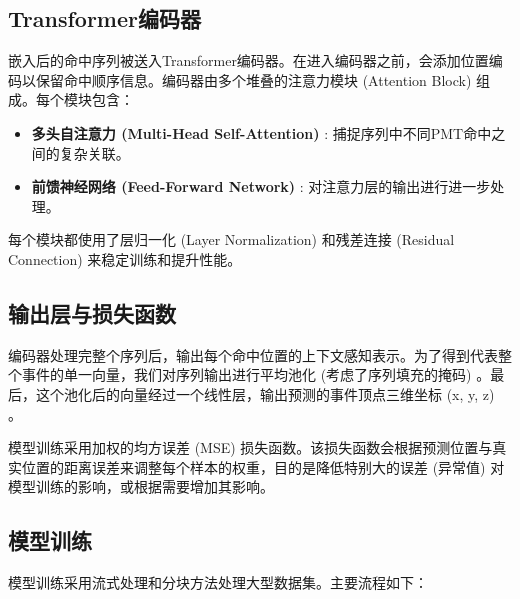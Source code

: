 \subsection{Transformer编码器}
嵌入后的命中序列被送入Transformer编码器。在进入编码器之前，会添加位置编码以保留命中顺序信息。编码器由多个堆叠的注意力模块 (Attention Block) 组成。每个模块包含：
\begin{itemize}
    \item \textbf{多头自注意力 (Multi-Head Self-Attention) }: 捕捉序列中不同PMT命中之间的复杂关联。
    \item \textbf{前馈神经网络 (Feed-Forward Network) }: 对注意力层的输出进行进一步处理。
\end{itemize}
每个模块都使用了层归一化 (Layer Normalization) 和残差连接 (Residual Connection) 来稳定训练和提升性能。

\subsection{输出层与损失函数}
编码器处理完整个序列后，输出每个命中位置的上下文感知表示。为了得到代表整个事件的单一向量，我们对序列输出进行平均池化 (考虑了序列填充的掩码) 。最后，这个池化后的向量经过一个线性层，输出预测的事件顶点三维坐标 (x, y, z) 。

模型训练采用加权的均方误差 (MSE) 损失函数。该损失函数会根据预测位置与真实位置的距离误差来调整每个样本的权重，目的是降低特别大的误差 (异常值) 对模型训练的影响，或根据需要增加其影响。

\subsection{模型训练}

模型训练采用流式处理和分块方法处理大型数据集。主要流程如下：

